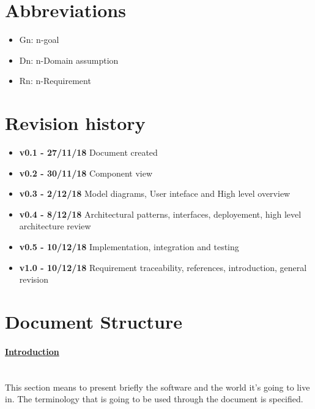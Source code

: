 \section{Abbreviations}
\begin{itemize}
\item Gn: n-goal
\item Dn: n-Domain assumption
\item Rn: n-Requirement
\end{itemize}

\section{Revision history}
\begin{itemize}
\item \textbf{v0.1 - 27/11/18} Document created
\item \textbf{v0.2 - 30/11/18} Component view
\item \textbf{v0.3 - 2/12/18} Model diagrams, User inteface and High level overview
\item \textbf{v0.4 - 8/12/18} Architectural patterns, interfaces, deployement, high level architecture review
\item \textbf{v0.5 - 10/12/18} Implementation, integration and testing 
\item \textbf{v1.0 - 10/12/18} Requirement traceability, references, introduction, general revision
\end{itemize}
\section{Document Structure}
\paragraph{\hyperref[sect:introduction]{Introduction}} \mbox{}\\
This section means to present briefly the software and the world it’s going to live in. The terminology that is going to be used through the document is specified.
